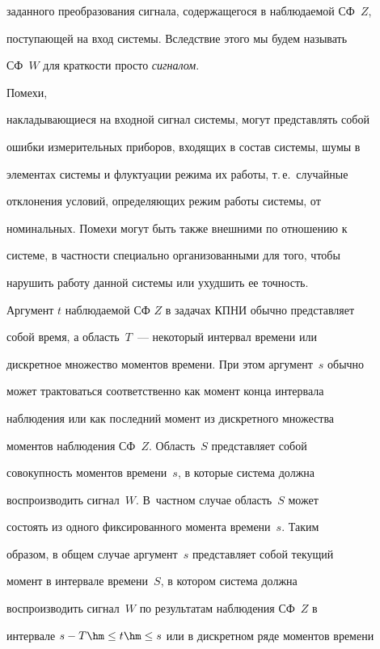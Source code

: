 заданного преобразования  сигнала, содержащегося в наблюдаемой СФ~$Z$, 


поступающей на вход системы. Вследствие этого мы будем называть


СФ~$W$ для краткости просто  \textit{сигналом}. 





Помехи,


накладывающиеся  на входной сигнал системы, могут представлять собой


ошибки измерительных приборов, входящих в состав системы, шумы в


элементах системы и флуктуации режима их работы, т.\,е.\ случайные


отклонения условий, определяющих режим работы системы, от


номинальных. Помехи могут быть также внешними по  отношению к


системе, в частности специально организованными для  того, чтобы


нарушить работу данной системы или ухудшить ее точность.





Аргумент $t$ наблюдаемой СФ $Z$ в задачах \mbox{КПНИ} обычно представляет


собой время, а область~$T$~--- некоторый интервал времени или


дискретное множество моментов времени. При этом аргумент~$s$ обычно


может трактоваться соответственно как момент конца интервала


наблюдения или как последний момент из дискретного множества


моментов наблюдения СФ~$Z$. Область~$S$ представляет собой


совокупность моментов времени~$s$, в которые система должна


воспроизводить сигнал~$W$. В~частном случае область~$S$ может


состоять из одного фиксированного момента времени~$s$. Таким


образом, в общем случае аргумент~$s$ представляет собой текущий


момент в интервале времени~$S$, в котором система должна


воспроизводить сигнал~$W$ по результатам наблюдения СФ~$Z$ в


интервале  $s-T \hm\le t\hm \le s$ или в дискретном ряде моментов времени


